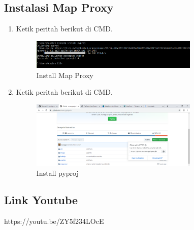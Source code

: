 \subsection{Instalasi Map Proxy}
\begin{enumerate}
	\item  Ketik peritah berikut di CMD.
	\hfill\break
	\begin{figure}[H]
		\includegraphics[width=8cm]{figures/Tugas4/1174074/11.png}
		\centering
		\caption{Install Map Proxy}
	\end{figure}
	\item  Ketik peritah berikut di CMD.
	\hfill\break
	\begin{figure}[H]
		\includegraphics[width=8cm]{figures/Tugas4/1174074/12.png}
		\centering
		\caption{Install pyproj}
	\end{figure}
\end{enumerate}
\subsection{Link Youtube}
https://youtu.be/ZY5f234LOcE

